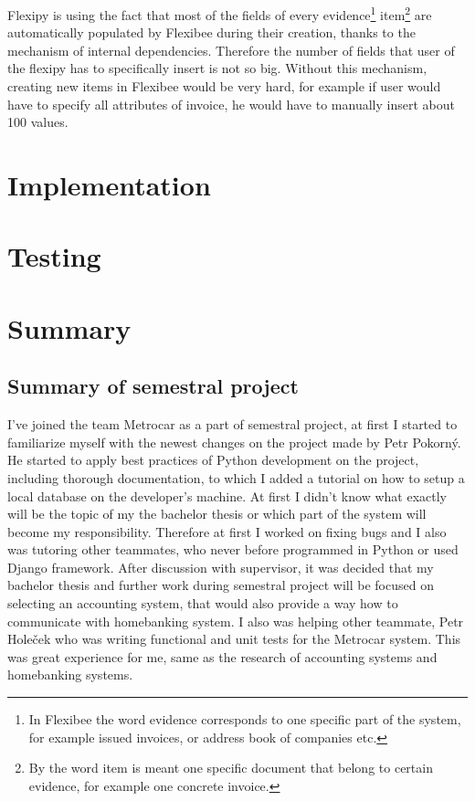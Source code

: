 \documentclass[11pt,twoside,a4paper]{book}
\begin{document}
Flexipy is using the fact that most of the fields of every evidence\footnote{In Flexibee the word evidence corresponds to one specific part of the system, for example issued invoices, or address book of companies etc.} item\footnote{By the word item is meant one specific document that belong to certain evidence, for example one concrete invoice.} are automatically populated by Flexibee during their creation, thanks to the mechanism of internal dependencies\cite{flexDep}. Therefore the number of fields that user of the flexipy has to specifically insert is not so big. Without this mechanism, creating new items in Flexibee would be very hard, for example if user would have to specify all attributes of invoice, he would have to manually insert about 100 values. 



\chapter{Implementation}



\chapter{Testing}


\chapter{Summary}
\section{Summary of semestral project}
I've joined the team Metrocar as a part of semestral project, at first I started to familiarize myself with the newest 
changes on the project made by Petr Pokorný. He started to apply best practices of Python development on the project, including thorough documentation, to which I added a tutorial on how to setup a local database on the developer's machine. At first I didn't know what exactly will be the topic of my the bachelor thesis or which part of the system will become my responsibility. Therefore at first I worked on fixing bugs and I also was tutoring other teammates, who never before programmed in Python or used Django framework. After discussion with supervisor, it was decided that my bachelor thesis and further work during semestral project will be focused on selecting an accounting system, that would also provide a way how to communicate with homebanking system. I also was helping other teammate, Petr Holeček who was writing functional and unit tests for the Metrocar system. This was great experience for me, same as the research of accounting systems and homebanking systems. 
\end{document}
